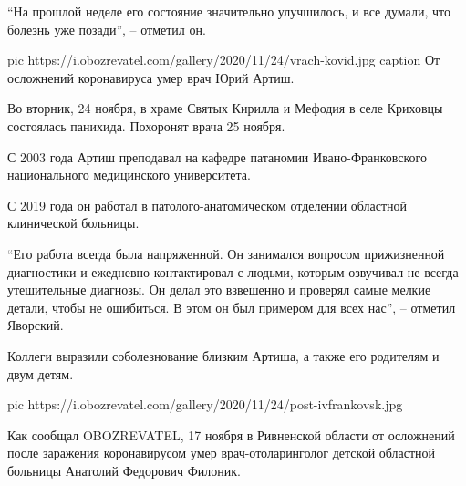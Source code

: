 \enquote{На прошлой неделе его состояние значительно улучшилось, и все думали, что
болезнь уже позади}, – отметил он.

\ifcmt
pic https://i.obozrevatel.com/gallery/2020/11/24/vrach-kovid.jpg
caption От осложнений коронавируса умер врач Юрий Артиш.
\fi

Во вторник, 24 ноября, в храме Святых Кирилла и Мефодия в селе Криховцы
состоялась панихида. Похоронят врача 25 ноября.

С 2003 года Артиш преподавал на кафедре патаномии Ивано-Франковского
национального медицинского университета.

С 2019 года он работал в патолого-анатомическом отделении областной
клинической больницы.

\enquote{Его работа всегда была напряженной. Он занимался вопросом прижизненной
диагностики и ежедневно контактировал с людьми, которым озвучивал не
всегда утешительные диагнозы. Он делал это взвешенно и проверял самые
мелкие детали, чтобы не ошибиться. В этом он был примером для всех нас}, –
отметил Яворский.

Коллеги выразили соболезнование близким Артиша, а также его родителям и
двум детям.

\ifcmt
pic https://i.obozrevatel.com/gallery/2020/11/24/post-ivfrankovsk.jpg
\fi

Как сообщал OBOZREVATEL, 17 ноября в Ривненской области от осложнений после
заражения коронавирусом умер врач-отоларинголог детской областной больницы
Анатолий Федорович Филоник.

